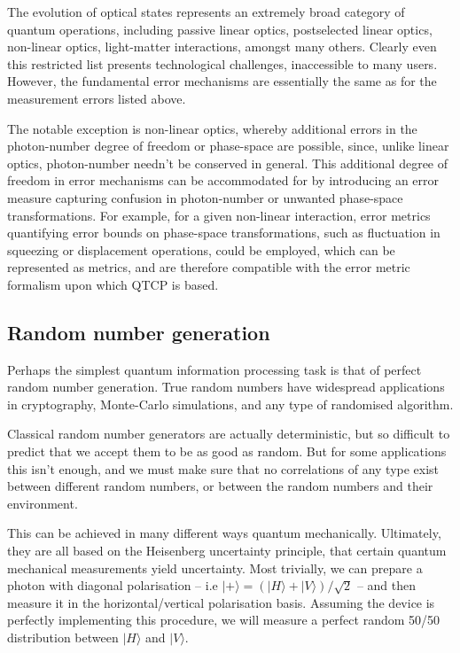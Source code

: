 \documentclass[aps,rmp,twocolumn,amsmath,amssymb,nofootinbib,superscriptaddress,longbibliography,floatfix]{revtex4-1}
\newcommand{\ket}[1]{|#1\rangle}
\begin{document}
The evolution of optical states represents an extremely broad category of quantum operations, including passive linear optics, postselected linear optics, non-linear optics, light-matter interactions, amongst many others. Clearly even this restricted list presents technological challenges, inaccessible to many users. However, the fundamental error mechanisms are essentially the same as for the measurement errors listed above.

The notable exception is non-linear optics, whereby additional errors in the photon-number degree of freedom or phase-space are possible, since, unlike linear optics, photon-number needn't be conserved in general. This additional degree of freedom in error mechanisms can be accommodated for by introducing an error measure capturing confusion in photon-number or unwanted phase-space transformations. For example, for a given non-linear interaction, error metrics quantifying error bounds on phase-space transformations, such as fluctuation in squeezing or displacement operations, could be employed, which can be represented as metrics, and are therefore compatible with the error metric formalism upon which QTCP is based.

%
%

\subsection{Random number generation}

Perhaps the simplest quantum information processing task is that of perfect random number generation. True random numbers have widespread applications in cryptography, Monte-Carlo simulations, and any type of randomised algorithm.

Classical random number generators are actually deterministic, but so difficult to predict that we accept them to be as good as random. But for some applications this isn't enough, and we must make sure that no correlations of any type exist between different random numbers, or between the random numbers and their environment.

This can be achieved in many different ways quantum mechanically. Ultimately, they are all based on the Heisenberg uncertainty principle, that certain quantum mechanical measurements yield uncertainty. Most trivially, we can prepare a photon with diagonal polarisation -- i.e \mbox{$\ket{+} = (\ket{H}+\ket{V})/\sqrt{2}$} -- and then measure it in the horizontal/vertical polarisation basis. Assuming the device is perfectly implementing this procedure, we will measure a perfect random 50/50 distribution between $\ket{H}$ and $\ket{V}$.
\end{document}
